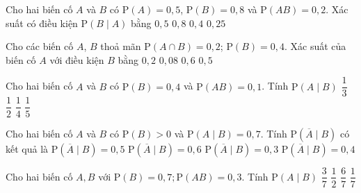 \begin{ex}%
	Cho hai biến cố $A$ và $B$  có $\mathrm{P}(A)=0{,}5$, $\mathrm{P}(B)=0{,}8$ và $\mathrm{P}(AB)=0{,}2$. Xác suất có điều kiện $\mathrm{P}(B\mid A)$ bằng
	\choice 
		{$0{,}5$} 
		 {$0{,}8$}
		 {\True $0{,}4$}
		{$0{,}25$} 
\end{ex}

\begin{ex}%
	Cho các biến  cố $A$, $B$ thoả mãn $\mathrm{P}(A\cap B)=0{,}2$; $\mathrm{P}(B)=0{,}4$. Xác suất của biến cố $A$ với điều kiện $B$ bằng
	 \choice
		 {$0{,}2$}
		 {$0{,}08$}
		{$0{,}6$} 
		{\True  $0{,}5$}
\end{ex}

\begin{ex}%
	Cho hai biến cố $A$ và $B$ có $\mathrm{P}\left(B\right)=0{,}4$  và $\mathrm{P}\left(AB\right)=0{,}1$. Tính $\mathrm{P}\left(A\mid B\right)$
	 \choice
		{$\dfrac{1}{3}$} 
		{$\dfrac{1}{2}$} 
		{\True  $\dfrac{1}{4}$}
		 {$\dfrac{1}{5}$}
\end{ex}

\begin{ex}%
	Cho hai  biến cố $A$ và $B$ có $\mathrm{P}\left(B\right)>0$ và $\mathrm{P}\left(A\mid B\right)=0{,}7$. Tính $\mathrm{P}\left(\overline{A}\mid B\right)$ có kết quả là
	 \choice
		 {$\mathrm{P}\left(\overline{A}\mid B\right)=0{,}5$}
		{$\mathrm{P}\left(\overline{A}\mid  B\right)=0{,}6$}
		{\True $\mathrm{P}\left(\overline{A}\mid B\right)=0{,}3$} 
		{$\mathrm{P}\left(\overline{A}\mid B\right)=0{,}4$} 
\end{ex}

\begin{ex}%
	Cho hai biến  cố $A,B$ với $\mathrm{P}\left(B\right)=0{,}7;\mathrm{P}\left(AB\right)=0{,}3$. Tính $\mathrm{P}\left(A\mid B\right)$
	\choice 
		{\True  $\dfrac{3}{7}$}
		 {$\dfrac{1}{2}$}
		 {$\dfrac{6}{7}$}
		 {$\dfrac{1}{7}$}
\end{ex}


